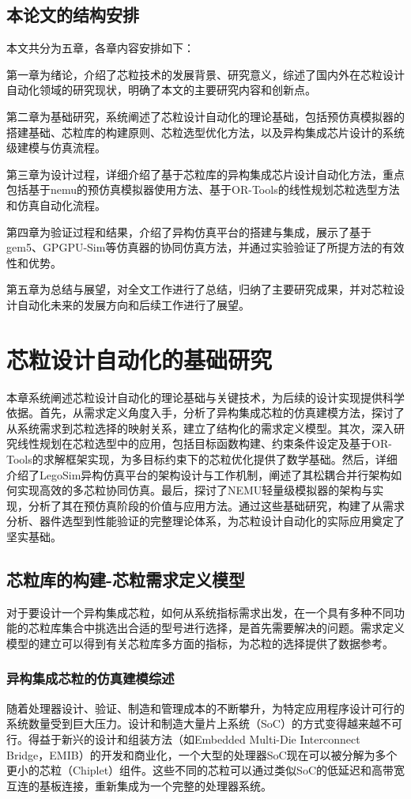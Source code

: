 \documentclass[bachelor]{thesis-uestc}
\begin{document}
\section{本论文的结构安排}
本文共分为五章，各章内容安排如下：

第一章为绪论，介绍了芯粒技术的发展背景、研究意义，综述了国内外在芯粒设计自动化领域的研究现状，明确了本文的主要研究内容和创新点。

第二章为基础研究，系统阐述了芯粒设计自动化的理论基础，包括预仿真模拟器的搭建基础、芯粒库的构建原则、芯粒选型优化方法，以及异构集成芯片设计的系统级建模与仿真流程。

第三章为设计过程，详细介绍了基于芯粒库的异构集成芯片设计自动化方法，重点包括基于nemu的预仿真模拟器使用方法、基于OR-Tools的线性规划芯粒选型方法和仿真自动化流程。

第四章为验证过程和结果，介绍了异构仿真平台的搭建与集成，展示了基于gem5、GPGPU-Sim等仿真器的协同仿真方法，并通过实验验证了所提方法的有效性和优势。

第五章为总结与展望，对全文工作进行了总结，归纳了主要研究成果，并对芯粒设计自动化未来的发展方向和后续工作进行了展望。

\chapter{芯粒设计自动化的基础研究}
本章系统阐述芯粒设计自动化的理论基础与关键技术，为后续的设计实现提供科学依据。首先，从需求定义角度入手，分析了异构集成芯粒的仿真建模方法，探讨了从系统需求到芯粒选择的映射关系，建立了结构化的需求定义模型。其次，深入研究线性规划在芯粒选型中的应用，包括目标函数构建、约束条件设定及基于OR-Tools的求解框架实现，为多目标约束下的芯粒优化提供了数学基础。然后，详细介绍了LegoSim异构仿真平台的架构设计与工作机制，阐述了其松耦合并行架构如何实现高效的多芯粒协同仿真。最后，探讨了NEMU轻量级模拟器的架构与实现，分析了其在预仿真阶段的价值与应用方法。通过这些基础研究，构建了从需求分析、器件选型到性能验证的完整理论体系，为芯粒设计自动化的实际应用奠定了坚实基础。

\section{芯粒库的构建-芯粒需求定义模型}
对于要设计一个异构集成芯粒，如何从系统指标需求出发，在一个具有多种不同功能的芯粒库集合中挑选出合适的型号进行选择，是首先需要解决的问题。需求定义模型的建立可以得到有关芯粒库多方面的指标，为芯粒的选择提供了数据参考。

\subsection{异构集成芯粒的仿真建模综述}
随着处理器设计、验证、制造和管理成本的不断攀升，为特定应用程序设计可行的系统数量受到巨大压力。设计和制造大量片上系统（SoC）的方式变得越来越不可行。得益于新兴的设计和组装方法（如Embedded Multi-Die Interconnect Bridge，EMIB）的开发和商业化，一个大型的处理器SoC现在可以被分解为多个更小的芯粒（Chiplet）组件。这些不同的芯粒可以通过类似SoC的低延迟和高带宽互连的基板连接，重新集成为一个完整的处理器系统。
\end{document}
